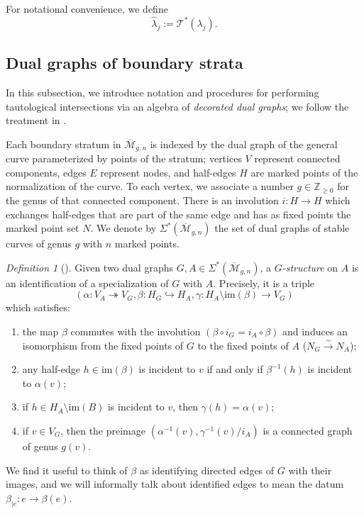 \documentclass[leqno,12pt]{amsart}
\theoremstyle{remark}
\newtheorem{definition}[theorem]{Definition}
\numberwithin{equation}{section}
\begin{document}

For notational convenience, we define 
\begin{equation}\label{eq:lambdahat}
    \hat{\lambda}_j := \mathcal{T}^*(\lambda_j).
\end{equation}
\subsection{Dual graphs of boundary strata} In this subsection, we introduce notation and procedures for performing tautological intersections via an algebra of \emph{decorated dual graphs}; we follow the treatment  in \cite{graberpandharipande, Yang}. 

Each boundary stratum  in $\overline{\mathcal{M}}_{g, n}$ is indexed by the dual graph of the general curve parameterized by points of the stratum; vertices $V$ represent connected components, edges $E$ represent nodes, and half-edges $H$ are marked points of the normalization of the curve. To each vertex, we  associate a number $g \in \mathbb{Z}_{\geq0}$ for the genus of that connected component. There is an involution $i: H \rightarrow H$ which exchanges half-edges that are part of the same edge and has as fixed points the marked point set $N$. We denote by $\Sigma^\ast(\mathcal{\overline{M}}_{g, n})$ the set of dual graphs of stable curves of genus $g$ with $n$ marked points.

\begin{definition}[\cite{graberpandharipande, Yang}]\label{G-structure} Given two dual graphs $G,A \in \Sigma^\ast(\mathcal{\overline{M}}_{g, n})$, a $G$\emph{-structure} on $A$ is an identification of a specialization of $G$ with $A$. Precisely, it is a triple $$(\alpha: V_A \twoheadrightarrow V_G, \beta: H_G \hookrightarrow H_A, \gamma: H_A \setminus \text{im}(\beta) \rightarrow V_G)$$
which satisfies:
\begin{enumerate}
    \item the map $\beta$ commutes with the involution $(\beta \circ i_G = i_A \circ \beta)$ and induces an isomorphism from the fixed points of $G$ to the fixed points of $A$ ($N_G \xrightarrow{\sim} N_A$);
    \item any half-edge $h \in \text{im}(\beta)$ is incident to $v$ if and only if $\beta^{-1}(h)$ is incident to $\alpha(v)$;
    \item if $h \in H_A \setminus \text{im}(B)$ is incident to $v$, then $\gamma(h) = \alpha(v)$;
    \item if $v \in V_G$, then the preimage $(\alpha^{-1}(v), \gamma^{-1}(v)/i_A)$ is a connected graph of genus $g(v)$.
\end{enumerate}
\end{definition}
We find it useful to think of $\beta$ as identifying directed edges of $G$ with their images, and we will informally talk about identified edges to mean the datum $\beta_{|e}: e\to \beta(e)$.
\end{document}
